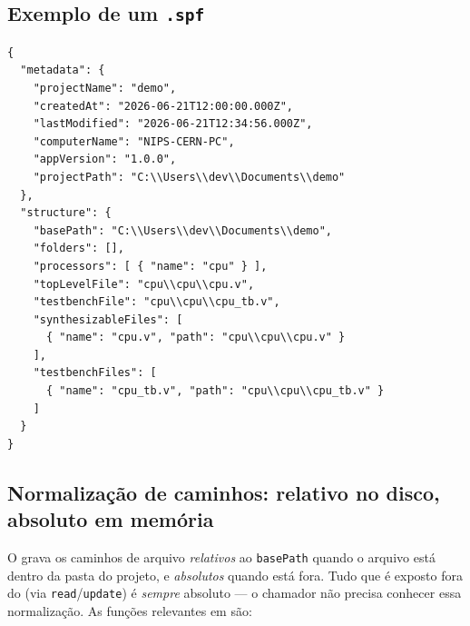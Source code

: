 \subsection{Exemplo de um \texttt{.spf}}

\begin{lstlisting}
{
  "metadata": {
    "projectName": "demo",
    "createdAt": "2026-06-21T12:00:00.000Z",
    "lastModified": "2026-06-21T12:34:56.000Z",
    "computerName": "NIPS-CERN-PC",
    "appVersion": "1.0.0",
    "projectPath": "C:\\Users\\dev\\Documents\\demo"
  },
  "structure": {
    "basePath": "C:\\Users\\dev\\Documents\\demo",
    "folders": [],
    "processors": [ { "name": "cpu" } ],
    "topLevelFile": "cpu\\cpu\\cpu.v",
    "testbenchFile": "cpu\\cpu\\cpu_tb.v",
    "synthesizableFiles": [
      { "name": "cpu.v", "path": "cpu\\cpu\\cpu.v" }
    ],
    "testbenchFiles": [
      { "name": "cpu_tb.v", "path": "cpu\\cpu\\cpu_tb.v" }
    ]
  }
}
\end{lstlisting}

\subsection{Normalização de caminhos: relativo no disco, absoluto em memória}
\label{sec:spf-paths}

O  grava os caminhos de arquivo \emph{relativos} ao
\lstinline|basePath| quando o arquivo está dentro da pasta do projeto, e
\emph{absolutos} quando está fora. Tudo que é exposto fora do 
(via \lstinline|read|/\lstinline|update|) é \emph{sempre} absoluto — o chamador
não precisa conhecer essa normalização. As funções relevantes em
 são:

